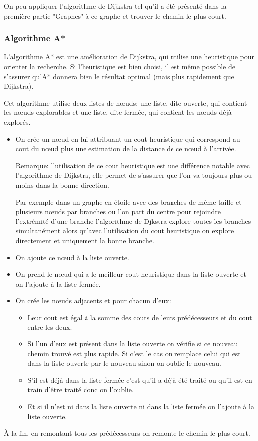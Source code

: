     On peu appliquer l'algorithme de Dijkstra tel qu'il a été présenté dans la
    première partie "Graphes" à ce graphe et trouver le chemin le plus court.

  \subsubsection{Algorithme A*}
    L'algorithme A* est une amélioration de Dijkstra, qui utilise une heuristique
    pour orienter la recherche.
    Si l'heuristique est bien choisi, il est même possible de s'assurer qu'A*
    donnera bien le résultat optimal (mais plus rapidement que Dijkstra).

    Cet algorithme utilise deux listes de nœuds: une liste, dite ouverte, qui
    contient les nœuds explorables et une liste, dite fermée, qui contient les
    nœuds déjà explorés.

    \begin{itemize}
      \item On crée un nœud en lui attribuant un cout heuristique qui
        correspond au cout du nœud plus une estimation de la distance de ce
        nœud à l'arrivée.

        Remarque: l'utilisation de ce cout heuristique est une différence
        notable avec l'algorithme de Dijkstra, elle permet de s'assurer que
        l'on va toujours plus ou moins dans la bonne direction.

        Par exemple dans un graphe en étoile avec des branches de même taille
        et plusieurs nœuds par branches ou l'on part du centre pour rejoindre
        l'extrémité d'une branche l'algorithme de Djkstra explore toutes les
        branches simultanément alors qu'avec l'utilisation du cout heuristique
        on explore directement et uniquement la bonne branche.
      \item On ajoute ce nœud à la liste ouverte.
      \item On prend le nœud qui a le meilleur cout heuristique dans la liste
        ouverte et on l'ajoute à la liste fermée.
      \item On crée les nœuds adjacents et pour chacun d'eux:
        \begin{itemize}
          \item Leur cout est égal à la somme des couts de leurs prédécesseurs
            et du cout entre les deux.
          \item Si l'un d'eux est présent dans la liste ouverte on vérifie si
            ce nouveau chemin trouvé est plus rapide. Si c'est le cas on
            remplace celui qui est dans la liste ouverte par le nouveau sinon
            on oublie le nouveau.
          \item S'il est déjà dans la liste fermée c'est qu'il a déjà été
            traité ou qu'il est en train d'être traité donc on l'oublie.
          \item Et si il n'est ni dans la liste ouverte ni dans la liste fermée
            on l'ajoute à la liste ouverte.
        \end{itemize}
    \end{itemize}
	
    À la fin, en remontant tous les prédécesseurs on remonte le chemin le plus
    court.

